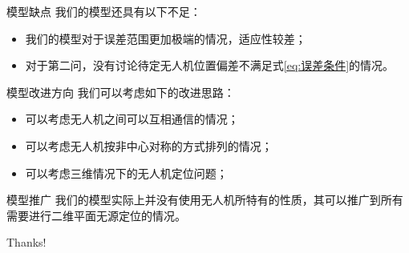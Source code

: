 \documentclass[aspectratio=169]{beamer}
\begin{document}
\begin{frame}{模型缺点}
    我们的模型还具有以下不足：
    \begin{itemize}
        \item 我们的模型对于误差范围更加极端的情况，适应性较差；
        \item 对于第二问，没有讨论待定无人机位置偏差不满足式\ref{eq:误差条件}的情况。
    \end{itemize}
\end{frame}

\begin{frame}{模型改进方向}
    我们可以考虑如下的改进思路：
    \begin{itemize}
        \item 可以考虑无人机之间可以互相通信的情况；
        \item 可以考虑无人机按非中心对称的方式排列的情况；
        \item 可以考虑三维情况下的无人机定位问题；
    \end{itemize}
\end{frame}

\begin{frame}{模型推广}
    我们的模型实际上并没有使用无人机所特有的性质，其可以推广到所有需要进行二维平面无源定位的情况。
\end{frame}

\appendix

\begin{frame}
    \begin{center}
        {\Huge\calligra Thanks!}
    \end{center}
\end{frame}
\end{document}
